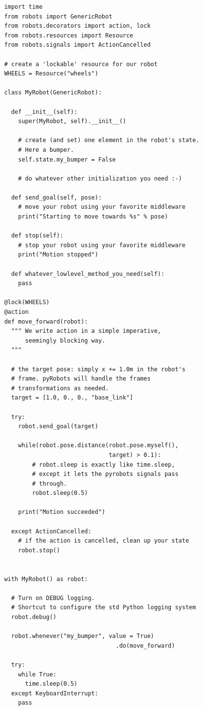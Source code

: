 \documentclass[a4paper, 10pt, conference]{ieeeconf}      %
\begin{document}
\begin{verbatim}
    import time
    from robots import GenericRobot
    from robots.decorators import action, lock
    from robots.resources import Resource
    from robots.signals import ActionCancelled

    # create a 'lockable' resource for our robot
    WHEELS = Resource("wheels")

    class MyRobot(GenericRobot):

      def __init__(self):
        super(MyRobot, self).__init__()

        # create (and set) one element in the robot's state.
        # Here a bumper.
        self.state.my_bumper = False

        # do whatever other initialization you need :-)

      def send_goal(self, pose):
        # move your robot using your favorite middleware
        print("Starting to move towards %s" % pose)

      def stop(self):
        # stop your robot using your favorite middleware
        print("Motion stopped")

      def whatever_lowlevel_method_you_need(self):
        pass

    @lock(WHEELS)
    @action
    def move_forward(robot):
      """ We write action in a simple imperative, 
          seemingly blocking way.
      """

      # the target pose: simply x += 1.0m in the robot's 
      # frame. pyRobots will handle the frames 
      # transformations as needed.
      target = [1.0, 0., 0., "base_link"]

      try:
        robot.send_goal(target)

        while(robot.pose.distance(robot.pose.myself(), 
                                  target) > 0.1):
            # robot.sleep is exactly like time.sleep, 
            # except it lets the pyrobots signals pass 
            # through.
            robot.sleep(0.5)

        print("Motion succeeded")

      except ActionCancelled:
        # if the action is cancelled, clean up your state
        robot.stop()


    with MyRobot() as robot:

      # Turn on DEBUG logging.
      # Shortcut to configure the std Python logging system
      robot.debug()

      robot.whenever("my_bumper", value = True)
                                    .do(move_forward)

      try:
        while True:
          time.sleep(0.5)
      except KeyboardInterrupt:
        pass
\end{verbatim}
\end{document}
